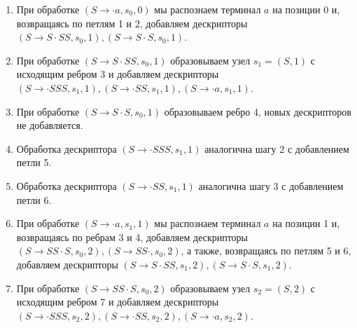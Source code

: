 \begin{example}
\begin{enumerate}
    \begin{center}
      
    \end{center}

    \item При обработке $ (S \to \cdot a, s_0, 0) $ мы распознаем терминал $a$ на позиции 0 и, возвращаясь по петлям 1 и 2, добавляем дескрипторы $ (S \to S \cdot S S, s_0, 1), (S \to S \cdot S, s_0, 1) $.

    \item При обработке $ (S \to S \cdot S S, s_0, 1) $ образовываем узел $s_1 = (S, 1)$ с исходящим ребром 3 и добавляем дескрипторы $ (S \to \cdot SSS, s_1, 1), (S \to \cdot SS, s_1, 1), (S \to \cdot a, s_1, 1) $.

    \begin{center}
      
    \end{center}

    \item При обработке $ (S \to S \cdot S, s_0, 1) $ образовываем ребро 4, новых дескрипторов не добавляется.

    \begin{center}
      
    \end{center}

    \item Обработка дескриптора $ (S \to \cdot S S S, s_1, 1) $ аналогична шагу 2 с добавлением петли 5.

    \begin{center}
      
    \end{center}

    \item Обработка дескриптора $ (S \to \cdot S S, s_1, 1) $ аналогична шагу 3 с добавлением петли 6.

    \begin{center}
      
    \end{center}

    \item При обработке $ (S \to \cdot a, s_1, 1) $ мы распознаем терминал $a$ на позиции 1 и, возвращаясь по ребрам 3 и 4, добавляем дескрипторы $ (S \to S S \cdot S, s_0, 2), (S \to S S \cdot, s_0, 2) $, а также, возвращаясь по петлям 5 и 6, добавляем дескрипторы $ (S \to S \cdot S S, s_1, 2), (S \to S \cdot S, s_1, 2) $.

    \item При обработке $ (S \to S S \cdot S, s_0, 2) $ образовываем узел $s_2 = (S, 2)$ с исходящим ребром 7 и добавляем дескрипторы $ (S \to \cdot SSS, s_2, 2), (S \to \cdot SS, s_2, 2), (S \to \cdot a, s_2, 2) $.


\end{enumerate}
\end{example}
